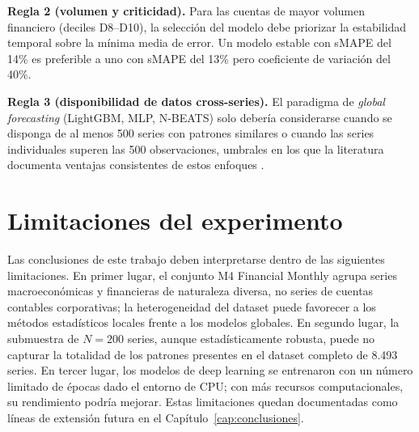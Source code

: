 \textbf{Regla 2 (volumen y criticidad).} Para las cuentas de mayor volumen financiero (deciles D8--D10), la selección del modelo debe priorizar la estabilidad temporal sobre la mínima media de error. Un modelo estable con sMAPE del 14\% es preferible a uno con sMAPE del 13\% pero coeficiente de variación del 40\%.

\textbf{Regla 3 (disponibilidad de datos cross-series).} El paradigma de \textit{global forecasting} (LightGBM, MLP, N-BEATS) solo debería considerarse cuando se disponga de al menos 500 series con patrones similares o cuando las series individuales superen las 500 observaciones, umbrales en los que la literatura documenta ventajas consistentes de estos enfoques \parencite{Januschowski2020, Cerqueira2022}.

\section{Limitaciones del experimento}
\label{sec:limitaciones}

Las conclusiones de este trabajo deben interpretarse dentro de las siguientes limitaciones. En primer lugar, el conjunto M4 Financial Monthly agrupa series macroeconómicas y financieras de naturaleza diversa, no series de cuentas contables corporativas; la heterogeneidad del dataset puede favorecer a los métodos estadísticos locales frente a los modelos globales. En segundo lugar, la submuestra de $N=200$ series, aunque estadísticamente robusta, puede no capturar la totalidad de los patrones presentes en el dataset completo de 8.493 series. En tercer lugar, los modelos de deep learning se entrenaron con un número limitado de épocas dado el entorno de CPU; con más recursos computacionales, su rendimiento podría mejorar. Estas limitaciones quedan documentadas como líneas de extensión futura en el Capítulo~\ref{cap:conclusiones}.
